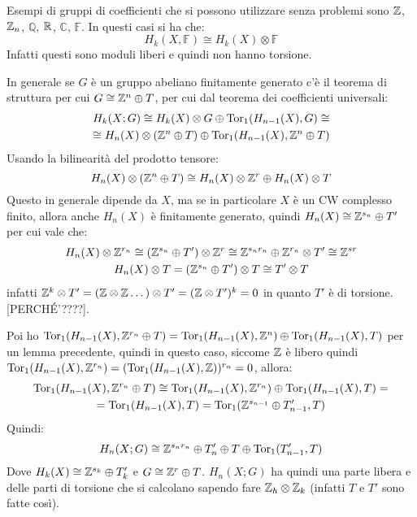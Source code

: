 \begin{osservation}
  Esempi di gruppi di coefficienti che si possono utilizzare senza problemi sono
  $ \mathbb{Z} $, $ \mathbb{Z}_n $, $ \mathbb{Q} $, $ \mathbb{R}^{} $, $ \mathbb{C} $, $ \mathbb{F} $.
  In questi casi si ha che:
  \[
    H_k(X, \mathbb{F}) \cong H_k(X) \otimes \mathbb{F}
  \]
  Infatti questi sono moduli liberi e quindi non hanno torsione.
\end{osservation}

\begin{osservation}
  In generale se $ G $ è un gruppo abeliano finitamente generato c'è il teorema di struttura
  per cui $ G \cong \mathbb{Z}^n \oplus T $, per cui dal teorema dei coefficienti universali:
  \begin{gather*}
    H_k(X;G) \cong H_k(X) \otimes G \oplus \mathrm{Tor_1}( H_{n-1}(X), G) \cong \\
    \cong H_n(X) \otimes (\mathbb{Z}^n \oplus T) \oplus \mathrm{Tor_1}( H_{n-1}(X), \mathbb{Z}^n \oplus T)
  \end{gather*}
  Usando la bilinearità del prodotto tensore:
  \[
    H_n(X) \otimes (\mathbb{Z}^n \oplus T) \cong H_n(X) \otimes \mathbb{Z}^r \oplus H_n(X) \otimes T
  \]
  Questo in generale dipende da $ X $, ma se in particolare $ X $ è un CW
  complesso finito, allora anche $ H_n(X) $ è finitamente generato, quindi
  $ H_n(X) \cong \mathbb{Z}^{s_n} \oplus T' $ per cui vale che:
  \begin{gather*}
    H_n(X) \otimes \mathbb{Z}^{r_n} \cong (\mathbb{Z}^{s_n} \oplus T') \otimes \mathbb{Z}^r \cong \mathbb{Z}^{s_n r_n} \oplus \mathbb{Z}^{r_n} \otimes T' \cong \mathbb{Z}^{sr} \\
    H_n(X) \otimes T = (\mathbb{Z}^{s_n} \oplus T') \otimes T \cong T' \otimes T
  \end{gather*}
  infatti
  $ \mathbb{Z}^k \otimes T' = (\mathbb{Z} \otimes \mathbb{Z} \dots ) \otimes T' = (\mathbb{Z} \otimes T')^k = 0 $ in quanto
  $ T' $ è di torsione. [PERCHÉ'????].

  Poi ho
  $ \mathrm{Tor_1}( H_{n-1}(X), \mathbb{Z}^{r_n} \oplus T) = \mathrm{Tor_1}( H_{n-1}(X), \mathbb{Z}^n) \oplus \mathrm{Tor_1}( H_{n-1}(X), T) $
  per un lemma precedente, quindi in questo caso, siccome $ \mathbb{Z} $ è libero quindi
  $ \mathrm{Tor_1}( H_{n-1}(X), \mathbb{Z}^{r_n}) = (\mathrm{Tor_1}( H_{n-1}(X), \mathbb{Z}))^{r_n} = 0 $, allora:
   \begin{gather*}
     \mathrm{Tor_1}( H_{n-1}(X), \mathbb{Z}^{r_n} \oplus T) \cong \mathrm{Tor_1}( H_{n-1}(X), \mathbb{Z}^{r_n}) \oplus \mathrm{Tor_1}( H_{n-1}(X), T) = \\
     = \mathrm{Tor_1}( H_{n-1}(X), T) = \mathrm{Tor_1}( \mathbb{Z}^{s_{n-1}} \oplus T'_{n-1}, T)
   \end{gather*}
   Quindi:
   \[
     H_n(X; G) \cong \mathbb{Z}^{s_n r_n} \oplus T_n' \oplus T \oplus \mathrm{Tor_1}( T_{n-1}', T)
   \]
   Dove $ H_k(X) \cong \mathbb{Z}^{s_k} \oplus T_k' $ e $ G \cong \mathbb{Z}^r \oplus T $.
   $ H_n(X;G) $ ha quindi una parte libera e delle parti di torsione che si calcolano
   sapendo fare $ \mathbb{Z}_h \otimes \mathbb{Z}_k $ (infatti $ T $ e $ T' $ sono fatte così).
 \end{osservation}


